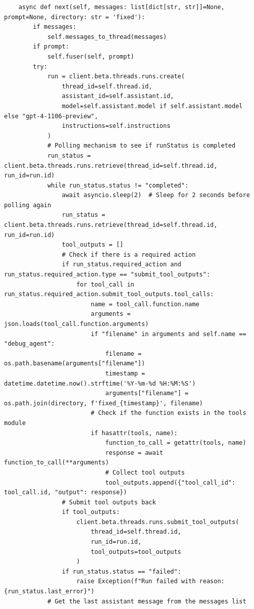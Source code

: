 \begin{listing}
\begin{verbatim}
    async def next(self, messages: list[dict[str, str]]=None, prompt=None, directory: str = 'fixed'):
        if messages:
            self.messages_to_thread(messages)
        if prompt:
            self.fuser(self, prompt)
        try:
            run = client.beta.threads.runs.create(
                thread_id=self.thread.id,
                assistant_id=self.assistant.id,
                model=self.assistant.model if self.assistant.model else "gpt-4-1106-preview",
                instructions=self.instructions
            )
            # Polling mechanism to see if runStatus is completed
            run_status = client.beta.threads.runs.retrieve(thread_id=self.thread.id, run_id=run.id)
            while run_status.status != "completed":
                await asyncio.sleep(2)  # Sleep for 2 seconds before polling again
                run_status = client.beta.threads.runs.retrieve(thread_id=self.thread.id, run_id=run.id)
                tool_outputs = []
                # Check if there is a required action
                if run_status.required_action and run_status.required_action.type == "submit_tool_outputs":
                    for tool_call in run_status.required_action.submit_tool_outputs.tool_calls:
                        name = tool_call.function.name
                        arguments = json.loads(tool_call.function.arguments)
                        if "filename" in arguments and self.name == "debug_agent": 
                            filename = os.path.basename(arguments["filename"])
                            timestamp = datetime.datetime.now().strftime('%Y-%m-%d %H:%M:%S')
                            arguments["filename"] = os.path.join(directory, f'fixed_{timestamp}', filename)
                        # Check if the function exists in the tools module
                        if hasattr(tools, name):
                            function_to_call = getattr(tools, name)
                            response = await function_to_call(**arguments)
                            # Collect tool outputs
                            tool_outputs.append({"tool_call_id": tool_call.id, "output": response})
                # Submit tool outputs back
                if tool_outputs:
                    client.beta.threads.runs.submit_tool_outputs(
                        thread_id=self.thread.id,
                        run_id=run.id,
                        tool_outputs=tool_outputs
                    )
                if run_status.status == "failed":
                    raise Exception(f"Run failed with reason: {run_status.last_error}")
            # Get the last assistant message from the messages list

\end{verbatim}
\end{listing}
